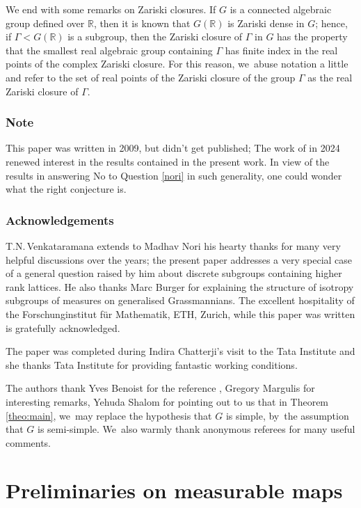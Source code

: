 \documentclass[JEP,XML,SOM,Unicode,published]{cedram}
\theoremstyle{definition}
\newcommand{\field}[1]{\mathbb{#1}}
\newcommand{\R}{\field{R}}
\begin{document}
We end with some remarks on Zariski closures. If $G$ is a connected algebraic group defined over $\R$, then it is known that $G(\R)$ is Zariski dense in $G$; hence, if $\Gamma < G(\R)$ is a subgroup, then the Zariski closure of $\Gamma$ in $G$ has the property that the smallest real algebraic group containing $\Gamma $ has finite index in
the real points of the complex Zariski closure. For this reason, we~abuse notation a little and refer to the set of
real points of the Zariski closure of the group $\Gamma $ as the real Zariski closure of $\Gamma$.

\subsubsection*{Note} This paper was written in 2009, but didn't get published; The work of \cite{DGK} in 2024 renewed interest in the results contained in the present work. In view of the results in \cite{DGK} answering No to Question \ref{nori} in such generality, one could wonder what the right conjecture is.

\subsubsection*{Acknowledgements}
T.N.\,Venkataramana extends to Madhav Nori his hearty thanks for
many very helpful discussions over the years; the present paper
addresses a very special case of a general question raised by him
about discrete subgroups containing higher rank lattices. He also
thanks Marc Burger for explaining the structure of isotropy subgroups
of measures on generalised Grassmannians. The excellent hospitality of
the Forschunginstitut für Mathematik, ETH, Zurich, while this paper
was written is gratefully acknowledged.

The paper was completed during Indira Chatterji's visit to the Tata
Institute and she thanks Tata Institute for providing fantastic
working conditions.

The authors thank Yves Benoist for the reference \cite{J-M}, Gregory Margulis for interesting remarks, Yehuda Shalom for pointing out to us that in Theorem \ref{theo:main}, we~may replace the hypothesis that $G$ is simple, by~the assumption that $G$ is semi-simple. We~also warmly thank anonymous referees for many useful comments.

\section{Preliminaries on measurable maps}
\end{document}
